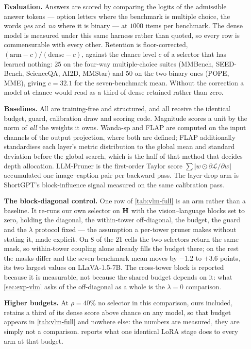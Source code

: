 \textbf{Evaluation.} Answers are scored by comparing the logits of the admissible answer tokens ---
option letters where the benchmark is multiple choice, the words \emph{yes} and \emph{no} where it is
binary --- at $1000$ items per benchmark. The dense model is measured under this same harness rather
than quoted, so every row is commensurable with every other. Retention is floor-corrected,
$(\text{arm}-c)/(\text{dense}-c)$, against the chance level $c$ of a selector that has learned
nothing: $25$ on the four-way multiple-choice suites (MMBench, SEED-Bench, ScienceQA, AI2D, MMStar)
and $50$ on the two binary ones (POPE, MME), giving $c{=}32.1$ for the seven-benchmark mean. Without
the correction a model at chance would read as a third of dense retained rather than zero.

\textbf{Baselines.} All are training-free and structured, and all receive the identical budget, guard,
calibration draw and scoring code. Magnitude scores a unit by the norm of \emph{all} the weights it
owns. Wanda-sp and FLAP are computed on the input channels of the output projection, where both are
defined; FLAP additionally standardises each layer's metric distribution to the global mean and
standard deviation before the global search, which is the half of that method that decides depth
allocation. LLM-Pruner is the first-order Taylor score $\sum |w \odot \partial \mathcal{L}/\partial
w|$ accumulated one image--caption pair per backward pass. The layer-drop arm is ShortGPT's
block-influence signal measured on the same calibration pass.

\textbf{The block-diagonal control.} One row of \cref{tab:vlm-full} is an arm rather than a
baseline. It re-runs our own selector on $\mathbf{H}$ with the vision--language blocks set to zero,
holding the diagonal, the within-tower off-diagonal, the budget, the guard and the $\lambda$
protocol fixed --- the assumption a per-tower pruner makes without stating it, made explicit. On $8$
of the $21$ cells the two selectors return the same mask, so within-tower coupling alone already
fills the budget there; on the rest the masks differ and the seven-benchmark mean moves by $-1.2$ to
$+3.6$ points, its two largest values on LLaVA-1.5-7B. The cross-tower block is reported because it
is measurable, not because the shared budget depends on it: what \cref{sec:exp-vlm} asks of the
off-diagonal as a whole is the $\lambda{=}0$ comparison.

\textbf{Higher budgets.} At $\rho{=}40\%$ no selector in this comparison, ours included, retains a
third of its dense score above chance on any model, so that budget appears in \cref{tab:vlm-full}
and nowhere else: the numbers are measured, they are simply not a comparison.  reports what one
identical LoRA stage does to every arm at that budget.

